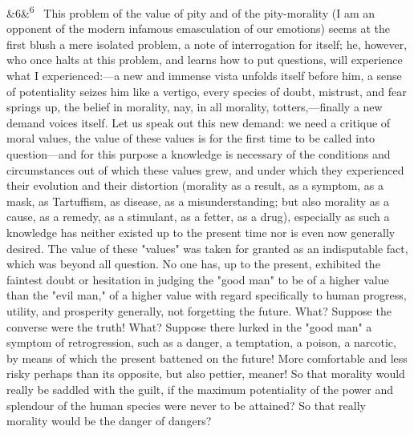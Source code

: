 \documentclass[12pt]{article}
\newcommand{\para}[1][]{\par\noindent\ifx&#1&\else\textsuperscript{\footnotesize #1}~\fi}
\begin{document}
\para[6] This problem of the value of pity and of the pity-morality (I am an opponent of the modern infamous emasculation of our emotions) seems at the first blush a mere isolated problem, a note of interrogation for itself; he, however, who once halts at this problem, and learns how to put questions, will experience what I experienced:---a new and immense vista unfolds itself before him, a sense of potentiality seizes him like a vertigo, every species of doubt, mistrust, and fear springs up, the belief in morality, nay, in all morality, totters,---finally a new demand voices itself. Let us speak out this new demand: we need a critique of moral values, the value of these values is for the first time to be called into question---and for this purpose a knowledge is necessary of the conditions and circumstances out of which these values grew, and under which they experienced their evolution and their distortion (morality as a result, as a symptom, as a mask, as Tartuffism, as disease, as a misunderstanding; but also morality as a cause, as a remedy, as a stimulant, as a fetter, as a drug), especially as such a knowledge has neither existed up to the present time nor is even now generally desired. The value of these "values" was taken for granted as an indisputable fact, which was beyond all question. No one has, up to the present, exhibited the faintest doubt or hesitation in judging the "good man" to be of a higher value than the "evil man," of a higher value with regard specifically to human progress, utility, and prosperity generally, not forgetting the future. What? Suppose the converse were the truth! What? Suppose there lurked in the "good man" a symptom of retrogression, such as a danger, a temptation, a poison, a narcotic, by means of which the present battened on the future! More comfortable and less risky perhaps than its opposite, but also pettier, meaner! So that morality would really be saddled with the guilt, if the maximum potentiality of the power and splendour of the human species were never to be attained? So that really morality would be the danger of dangers?
\end{document}
